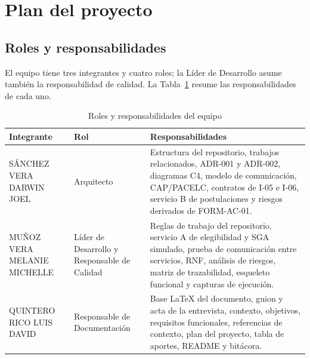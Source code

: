 \section{Plan del proyecto}
\label{sec:plan-proyecto}

\subsection{Roles y responsabilidades}
El equipo tiene tres integrantes y cuatro roles; la Líder de Desarrollo asume también la responsabilidad de calidad. La Tabla~\ref{tab:roles} resume las responsabilidades de cada uno.

\begin{table}[htbp]
\centering\small
\caption{Roles y responsabilidades del equipo}
\label{tab:roles}
\begin{tabularx}{\textwidth}{@{}>{\raggedright\arraybackslash}p{3.6cm}>{\raggedright\arraybackslash}p{3.3cm}>{\raggedright\arraybackslash}X@{}}
\toprule
\textbf{Integrante} & \textbf{Rol} & \textbf{Responsabilidades}\\
\midrule
SÁNCHEZ VERA DARWIN JOEL & Arquitecto & Estructura del repositorio, trabajos relacionados, ADR-001 y ADR-002, diagramas C4, modelo de comunicación, CAP/PACELC, contratos de I-05 e I-06, servicio B de postulaciones y riesgos derivados de FORM-AC-01.\\
MUÑOZ VERA MELANIE MICHELLE & Líder de Desarrollo y Responsable de Calidad & Reglas de trabajo del repositorio, servicio A de elegibilidad y SGA simulado, prueba de comunicación entre servicios, RNF, análisis de riesgos, matriz de trazabilidad, esqueleto funcional y capturas de ejecución.\\
QUINTERO RICO LUIS DAVID & Responsable de Documentación & Base LaTeX del documento, guion y acta de la entrevista, contexto, objetivos, requisitos funcionales, referencias de contexto, plan del proyecto, tabla de aportes, README y bitácora.\\
\bottomrule
\end{tabularx}
\end{table}

